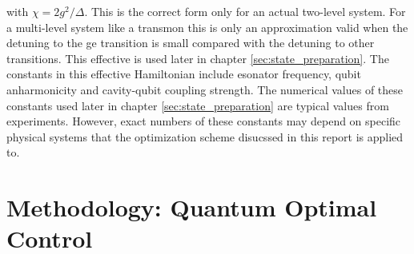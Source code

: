 \documentclass[12pt]{report}
\begin{document}
with $\chi=2 g^2 / \Delta$. This is the correct form only for an actual two-level system. 
For a multi-level system like a transmon this is only an approximation valid when the detuning to the ge transition is small compared with the detuning to other transitions.
This effective is used later in chapter \ref{sec:state_preparation}. 
The constants in this effective Hamiltonian include esonator frequency, qubit anharmonicity and cavity-qubit coupling strength. 
The numerical values of these constants used later in chapter \ref{sec:state_preparation} are typical values from experiments. 
However, exact numbers of these constants may depend on specific physical systems that the optimization scheme disucssed in this report is applied to. 

\chapter{Methodology: Quantum Optimal Control}
\end{document}
